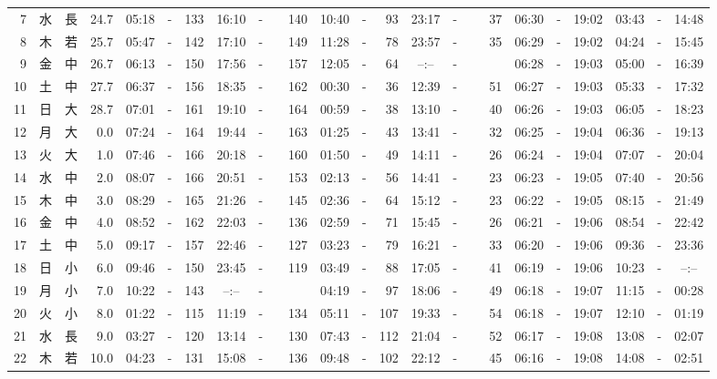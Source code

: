 \documentclass[12pt,a4j]{jsarticle}
\begin{document}
\begin{table}[htbp]
\begin{center}
{\begin{tabular}{|rc|cr|ccrccr|ccrccr|ccc|ccc|}
 7 & 水 & 長 & 24.7 &  05:18 &-& 133 &  16:10 &-& 140 &  10:40 &-&  93 &  23:17 &-&  37 & 06:30 & -& 19:02 & 03:43 & -& 14:48 \\
 8 & 木 & 若 & 25.7 &  05:47 &-& 142 &  17:10 &-& 149 &  11:28 &-&  78 &  23:57 &-&  35 & 06:29 & -& 19:02 & 04:24 & -& 15:45 \\
 9 & 金 & 中 & 26.7 &  06:13 &-& 150 &  17:56 &-& 157 &  12:05 &-&  64 &  --:-- &-&~~~~~ & 06:28 & -& 19:03 & 05:00 & -& 16:39 \\
10 & 土 & 中 & 27.7 &  06:37 &-& 156 &  18:35 &-& 162 &  00:30 &-&  36 &  12:39 &-&  51 & 06:27 & -& 19:03 & 05:33 & -& 17:32 \\
11 & 日 & 大 & 28.7 &  07:01 &-& 161 &  19:10 &-& 164 &  00:59 &-&  38 &  13:10 &-&  40 & 06:26 & -& 19:03 & 06:05 & -& 18:23 \\
12 & 月 & 大 &  0.0 &  07:24 &-& 164 &  19:44 &-& 163 &  01:25 &-&  43 &  13:41 &-&  32 & 06:25 & -& 19:04 & 06:36 & -& 19:13 \\
13 & 火 & 大 &  1.0 &  07:46 &-& 166 &  20:18 &-& 160 &  01:50 &-&  49 &  14:11 &-&  26 & 06:24 & -& 19:04 & 07:07 & -& 20:04 \\
14 & 水 & 中 &  2.0 &  08:07 &-& 166 &  20:51 &-& 153 &  02:13 &-&  56 &  14:41 &-&  23 & 06:23 & -& 19:05 & 07:40 & -& 20:56 \\
15 & 木 & 中 &  3.0 &  08:29 &-& 165 &  21:26 &-& 145 &  02:36 &-&  64 &  15:12 &-&  23 & 06:22 & -& 19:05 & 08:15 & -& 21:49 \\
16 & 金 & 中 &  4.0 &  08:52 &-& 162 &  22:03 &-& 136 &  02:59 &-&  71 &  15:45 &-&  26 & 06:21 & -& 19:06 & 08:54 & -& 22:42 \\
17 & 土 & 中 &  5.0 &  09:17 &-& 157 &  22:46 &-& 127 &  03:23 &-&  79 &  16:21 &-&  33 & 06:20 & -& 19:06 & 09:36 & -& 23:36 \\
18 & 日 & 小 &  6.0 &  09:46 &-& 150 &  23:45 &-& 119 &  03:49 &-&  88 &  17:05 &-&  41 & 06:19 & -& 19:06 & 10:23 & -& --:-- \\
19 & 月 & 小 &  7.0 &  10:22 &-& 143 &  --:-- &-&~~~~~ &  04:19 &-&  97 &  18:06 &-&  49 & 06:18 & -& 19:07 & 11:15 & -& 00:28 \\
20 & 火 & 小 &  8.0 &  01:22 &-& 115 &  11:19 &-& 134 &  05:11 &-& 107 &  19:33 &-&  54 & 06:18 & -& 19:07 & 12:10 & -& 01:19 \\
21 & 水 & 長 &  9.0 &  03:27 &-& 120 &  13:14 &-& 130 &  07:43 &-& 112 &  21:04 &-&  52 & 06:17 & -& 19:08 & 13:08 & -& 02:07 \\
22 & 木 & 若 & 10.0 &  04:23 &-& 131 &  15:08 &-& 136 &  09:48 &-& 102 &  22:12 &-&  45 & 06:16 & -& 19:08 & 14:08 & -& 02:51 \\

\end{tabular}}
\end{center}
\end{table}
\end{document}
